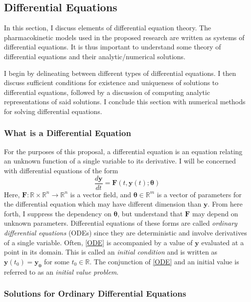 \subsection{Differential Equations}\label{sec:ODE}

In this section, I discuss elements of differential equation theory.  The pharmacokinetic models used in the proposed research are written as systems of differential equations.  It is thus important to understand some theory of differential equations and their analytic/numerical solutions.

I begin by delineating between different types of differential equations.  I then discuss sufficient conditions for existence and uniqueness of solutions to differential equations, followed by a discussion of computing analytic representations of said solutions.  I conclude this section with numerical methods for solving differential equations.

\subsubsection{What is a Differential Equation}

For the purposes of this proposal, a differential equation is an equation relating an unknown function of a single variable to its derivative. I will be concerned with differential equations of the form
%
\begin{equation}\label{ODE}
\dfrac{d \mathbf{y}}{dt}  = \mathbf{F}(t,\mathbf{y}(t);\bm{\theta})
\end{equation}
%
Here, $ \mathbf{F} : \mathbb{R} \times \mathbb{R}^n \rightarrow \mathbb{R}^n $ is a vector field, and $ \bm{\theta} \in \mathbb{R}^m $ is a vector of parameters for the differential equation which may have different dimension than $\mathbf{y}$.  From here forth, I suppress the dependency on $ \bm{\theta} $, but understand that $ \mathbf{F} $ may depend on unknown parameters. Differential equations of these forms are called \textit{ordinary differential equations} (ODEs) since they are deterministic and involve derivatives of a single variable.  Often, \cref{ODE} is accompanied by a value of $ \mathbf{y} $  evaluated at a point in its domain.  This is called an \textit{initial condition} and is written as $ \mathbf{y}(t_0) = \mathbf{y_0} $ for some $ t_0 \in \mathbb{R}$.  The conjunction of \cref{ODE} and an initial value is referred to as an \textit{initial value problem}.



\subsubsection{Solutions for Ordinary Differential Equations}

